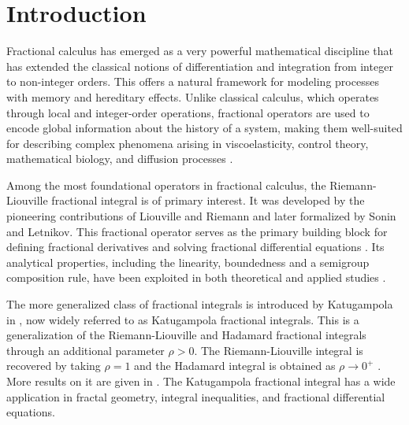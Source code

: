 \documentclass{amsproc}
\theoremstyle{definition}
\theoremstyle{remark}
\numberwithin{equation}{section}
\begin{document}
\maketitle

\section{Introduction}
 Fractional calculus has emerged as a very powerful mathematical discipline that has extended the classical notions of differentiation and integration from integer to non-integer orders. This offers a natural framework for modeling processes with memory and hereditary effects. Unlike classical calculus, which operates through local and integer-order operations, fractional operators are used to encode global information about the history of a system, making them well-suited for describing complex phenomena arising in viscoelasticity, control theory, mathematical biology, and diffusion processes \cite{Kilbas,Podlubny}. 
 
Among the most foundational operators in fractional calculus, the Riemann-Liouville fractional integral is of primary interest. It was developed by the pioneering contributions of Liouville and Riemann and later formalized by Sonin and Letnikov. This fractional operator serves as the primary building block for defining fractional derivatives and solving fractional differential equations \cite{Podlubny}. Its analytical properties, including the linearity, boundedness and a semigroup composition rule, have been exploited in both theoretical and applied studies \cite{Samko}. 

The more generalized class of fractional integrals is introduced by Katugampola in \cite{Katu1}, now widely referred to as Katugampola fractional integrals. This is a generalization of the Riemann-Liouville and Hadamard fractional integrals through an additional parameter $\rho>0$. The Riemann-Liouville integral is recovered by taking $\rho=1$  and the Hadamard integral is obtained as $\rho \to 0^+$ \cite{Katu1}. More results on it are given in \cite{Matar,Priya}.  The Katugampola fractional integral has a wide application in fractal geometry, integral inequalities, and fractional differential equations.
\end{document}
